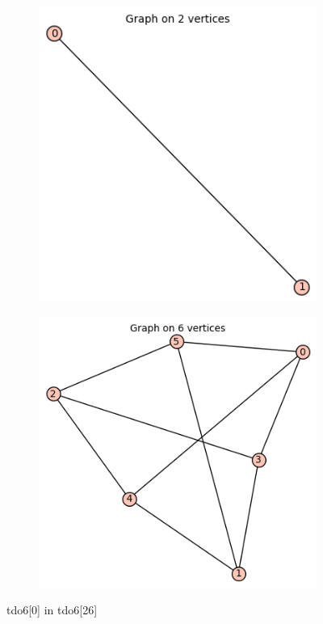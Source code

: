 \documentclass[12pt, a4paper]{article}
\begin{document}
\begin{center}
\begin{figure}[!htb]
\centering
\begin{subfigure}{0.5\textwidth}
  \centering
  \includegraphics[width=0.5\linewidth]{tdo6[0]}
\end{subfigure}%
\begin{subfigure}{0.5\textwidth}
  \centering
  \includegraphics[width=0.5\linewidth]{tdo6[26]}
\end{subfigure}
\caption{tdo6[0] in tdo6[26]}
\label{fig:test}
\end{figure}


\end{center}
\end{document}
